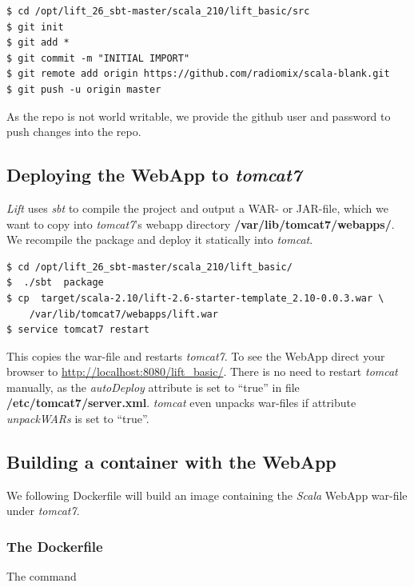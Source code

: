 \documentclass[11pt]{article}
\begin{document}
\begin{verbatim}
$ cd /opt/lift_26_sbt-master/scala_210/lift_basic/src
$ git init
$ git add *
$ git commit -m "INITIAL IMPORT"
$ git remote add origin https://github.com/radiomix/scala-blank.git
$ git push -u origin master
\end{verbatim}
As the repo is not world writable, we provide the github user and password to push changes into the repo.
\subsection{Deploying the WebApp to \emph{tomcat7}}
\label{sec-4-4}

\emph{Lift} uses \emph{sbt} to compile the project and output a WAR- or JAR-file, which we want to copy into \emph{tomcat7}'s webapp directory \textbf{/var/lib/tomcat7/webapps/}. We recompile the package and deploy it statically into \emph{tomcat}.

\begin{verbatim}
$ cd /opt/lift_26_sbt-master/scala_210/lift_basic/
$  ./sbt  package
$ cp  target/scala-2.10/lift-2.6-starter-template_2.10-0.0.3.war \
    /var/lib/tomcat7/webapps/lift.war
$ service tomcat7 restart
\end{verbatim}
This copies the war-file and restarts \emph{tomcat7}. To see the WebApp direct your browser to \href{http://localhost:8080/lift_basic/}{http://localhost:8080/lift\_basic/}. There is no need to restart \emph{tomcat} manually, as the \emph{autoDeploy} attribute is set to ``true'' in file \textbf{/etc/tomcat7/server.xml}. \emph{tomcat} even unpacks war-files if attribute \emph{unpackWARs} is set to ``true''.
\subsection{Building a container with the WebApp}
\label{sec-4-5}

We following Dockerfile will build an image containing the \emph{Scala} WebApp war-file under \emph{tomcat7}.
\subsubsection{The Dockerfile}
\label{sec-4-5-1}

The command 
\end{document}
